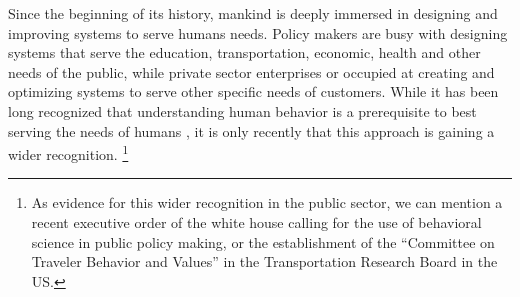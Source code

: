 Since the beginning of its history, mankind is deeply immersed in 
	designing and improving systems to serve humans needs.
Policy makers are busy with designing 
	systems that serve the education, transportation, economic, health and other 
	needs of the public,
while private sector enterprises or occupied at creating 
	and optimizing systems to serve other 
	specific needs of customers.
While it has been long recognized that 
	understanding human behavior is a prerequisite 
	to best serving the needs of humans \citet{},
	it is only recently that this approach is gaining a wider recognition.%
\footnote{
As evidence for this wider recognition in the public sector,
we can mention a recent executive order of the white house
calling for the use of behavioral science in public policy making, 
or the establishment of the ``Committee on Traveler Behavior and Values'' in the Transportation
Research Board in the US.}

